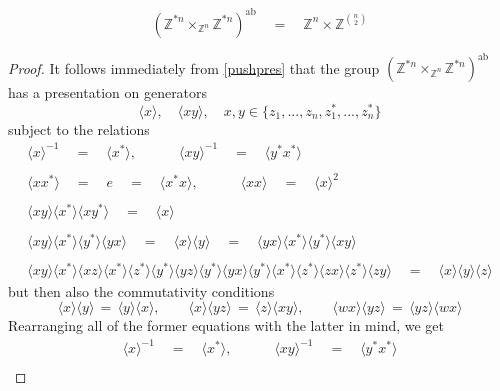 \documentclass{amsbook} %
\numberwithin{section}{chapter}
\begin{document}
\begin{prop} \label{abst}
\[ (\mathbb{Z}^{\ast n} \times_{\mathbb{Z}^n} \mathbb{Z}^{\ast n})^{\mathrm{ab}} \quad = \quad \mathbb{Z}^n \times {\mathbb{Z}}^{{n}\choose{2}} \]
\end{prop}
\begin{proof}
It follows immediately from \cref{pushpres} that the group $(\mathbb{Z}^{\ast n} \times_{\mathbb{Z}^n} \mathbb{Z}^{\ast n})^{\mathrm{ab}}$ has a presentation on generators
\[ \langle x \rangle, \quad \langle xy \rangle, \quad x,y \in \{z_1, ..., z_n, z_1^*, ..., z_n^*\} \]
subject to the relations
\[ \begin{array}{c}
			\langle x \rangle^{-1} \quad = \quad \langle x^* \rangle, \quad \quad \quad \langle xy \rangle^{-1} \quad = \quad \langle y^*x^* \rangle \\
			\\
			\langle xx^* \rangle \quad = \quad e \quad = \quad \langle x^*x \rangle, \quad \quad \quad \langle xx \rangle \quad = \quad \langle x \rangle^2 \\
			\\
			\langle xy \rangle \langle x^* \rangle \langle xy^* \rangle \quad = \quad \langle x \rangle  \\
			\\
			\langle xy \rangle \langle x^* \rangle \langle y^* \rangle \langle yx \rangle \quad = \quad \langle x \rangle \langle y \rangle  \quad = \quad \langle yx \rangle \langle x^* \rangle \langle y^* \rangle \langle xy \rangle \\
			\\
			\langle xy \rangle \langle x^* \rangle \langle xz \rangle \langle x^* \rangle \langle z^* \rangle \langle y^* \rangle \langle yz \rangle \langle y^* \rangle \langle yx \rangle \langle y^* \rangle \langle x^* \rangle \langle z^* \rangle \langle zx \rangle \langle z^* \rangle \langle zy \rangle \quad = \quad \langle x \rangle\langle y \rangle\langle z \rangle 
		\end{array}
\]
but then also the commutativity conditions
\[ \langle x \rangle \langle y \rangle \, = \, \langle y \rangle \langle x \rangle, \quad \quad \langle x \rangle \langle yz \rangle \, = \, \langle z \rangle \langle xy \rangle, \quad \quad	\langle wx \rangle \langle yz \rangle \, = \, \langle yz \rangle \langle wx \rangle \] 
Rearranging all of the former equations with the latter in mind, we get
\[ \begin{array}{c}
			\langle x \rangle^{-1} \quad = \quad \langle x^* \rangle, \quad \quad \quad \langle xy \rangle^{-1} \quad = \quad \langle y^*x^* \rangle \\

\end{array}\]
\end{proof}
\end{document}
